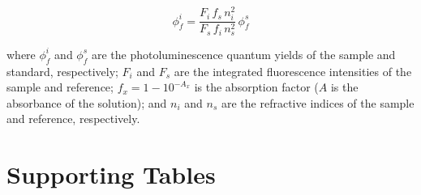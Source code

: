 \begin{equation}
	\phi_{f}^{i} = \frac{F_{i}\,f_{s}\,n_{i}^{2}}{F_{s}\,f_{i}\,n_{s}^{2}}\,\phi_{f}^{s}
	\label{eq:qy}
\end{equation}

\noindent where $\phi_{f}^{i}$ and $\phi_{f}^{s}$ are the photoluminescence quantum
yields of the sample and standard, respectively; $F_{i}$ and $F_{s}$ are the integrated
fluorescence intensities of the sample and reference; $f_{x} = 1 - 10^{-A_{x}}$ is the
absorption factor ($A$ is the absorbance of the solution); and $n_{i}$ and $n_{s}$ are
the refractive indices of the sample and reference, respectively.


\section*{Supporting Tables}
\renewcommand{\arraystretch}{1.15}

\small

